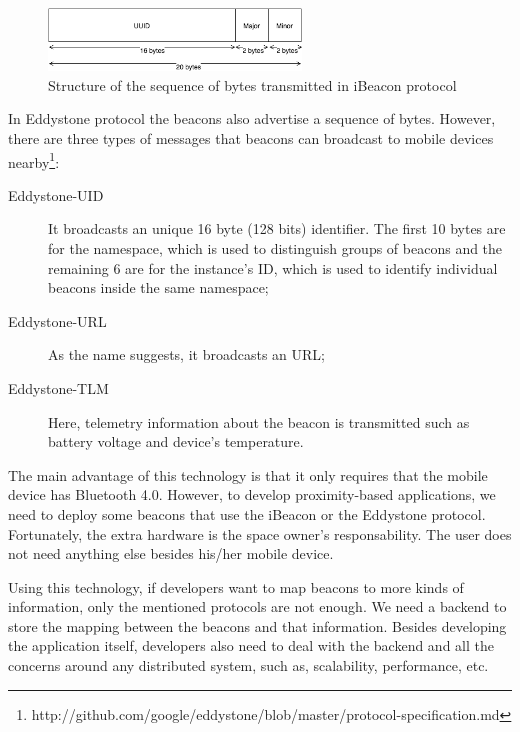 \begin{figure}[!ht]
  \centering
    \includegraphics[width=0.6\textwidth, keepaspectratio]{images/ibeacon_message}
    \caption[iBeacon message structure]{Structure of the sequence of bytes transmitted in iBeacon protocol}
    \label{fig:ibeacon_message}
\end{figure}

In Eddystone protocol the beacons also advertise a sequence of bytes.
However, there are three types of messages that beacons can broadcast to mobile devices nearby\footnote{http://github.com/google/eddystone/blob/master/protocol-specification.md}:
\begin{description}
  \item[Eddystone-UID]
  It broadcasts an unique 16 byte (128 bits) identifier. The first 10 bytes are for the namespace, which is used to distinguish groups of beacons and the remaining 6 are for the instance's \gls{ID}, which is used to identify individual beacons inside the same namespace;
  \item[Eddystone-URL]
  As the name suggests, it broadcasts an \gls{URL};
  \item[Eddystone-TLM]
  Here, telemetry information about the beacon is transmitted such as battery voltage and device's temperature.
\end{description}

The main advantage of this technology is that it only requires that the mobile device has Bluetooth 4.0.
However, to develop proximity-based applications, we need to deploy some beacons that use the iBeacon or the Eddystone protocol.
Fortunately, the extra hardware is the space owner's responsability.
The user does not need anything else besides his/her mobile device.

Using this technology, if developers want to map beacons to more kinds of information, only the mentioned protocols are not enough.
We need a backend to store the mapping between the beacons and that information.
Besides developing the application itself, developers also need to deal with the backend and all the concerns around any distributed system, such as, scalability, performance, etc.

